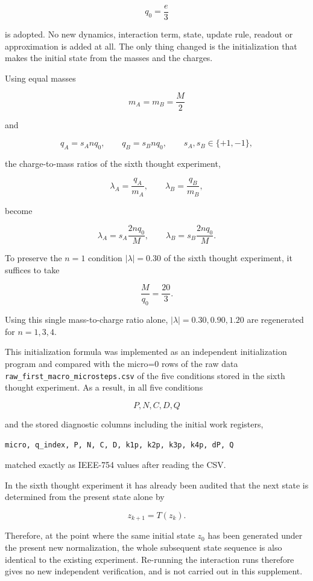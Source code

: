 \documentclass[
  a4paper,
]{article}
\begin{document}
\[
q_0=\frac{e}{3}
\]

is adopted. No new dynamics, interaction term, state, update rule,
readout or approximation is added at all. The only thing changed is the
initialization that makes the initial state from the masses and the
charges.

Using equal masses

\[
m_A=m_B=\frac{M}{2}
\]

and

\[
q_A=s_A n q_0,\qquad q_B=s_B n q_0,
\qquad s_A,s_B\in\{+1,-1\},
\]

the charge-to-mass ratios of the sixth thought experiment,

\[
\lambda_A=\frac{q_A}{m_A},\qquad
\lambda_B=\frac{q_B}{m_B},
\]

become

\[
\lambda_A=s_A\frac{2nq_0}{M},\qquad
\lambda_B=s_B\frac{2nq_0}{M}.
\]

To preserve the \(n=1\) condition \(|\lambda|=0.30\) of the sixth
thought experiment, it suffices to take

\[
\boxed{\frac{M}{q_0}=\frac{20}{3}}.
\]

Using this single mass-to-charge ratio alone,
\(|\lambda|=0.30,0.90,1.20\) are regenerated for \(n=1,3,4\).

This initialization formula was implemented as an independent
initialization program and compared with the micro=0 rows of the raw
data \texttt{raw\_first\_macro\_microsteps.csv} of the five conditions
stored in the sixth thought experiment. As a result, in all five
conditions

\[
P,N,C,D,Q
\]

and the stored diagnostic columns including the initial work registers,

\texttt{micro,\ q\_index,\ P,\ N,\ C,\ D,\ k1p,\ k2p,\ k3p,\ k4p,\ dP,\ Q}

matched exactly as IEEE-754 values after reading the CSV.

In the sixth thought experiment it has already been audited that the
next state is determined from the present state alone by

\[
z_{k+1}=T(z_k).
\]

Therefore, at the point where the same initial state \(z_0\) has been
generated under the present new normalization, the whole subsequent
state sequence is also identical to the existing experiment. Re-running
the interaction runs therefore gives no new independent verification,
and is not carried out in this supplement.
\end{document}
